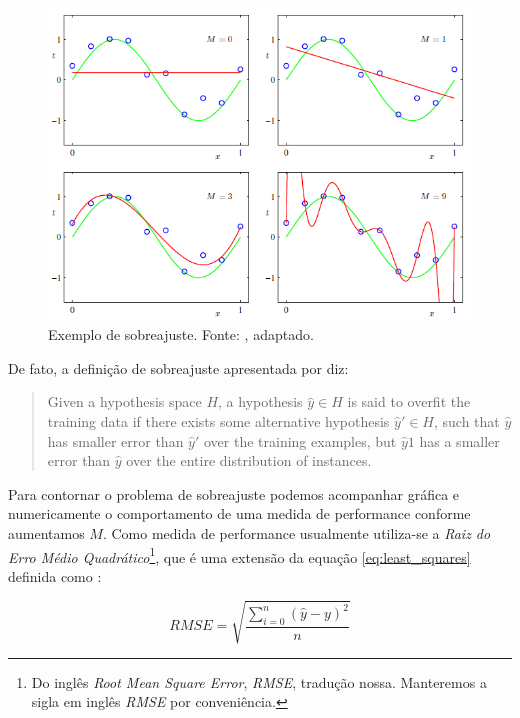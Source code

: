 \begin{figure}[h!]
\centering
\includegraphics[width=1\linewidth]{img/bishop_overfitting}
\caption[Exemplo de sobreajuste.]{Exemplo de sobreajuste. Fonte: \cite[p.7]{Bishop}, adaptado.}
\label{fig:bishop_overfitting}
\end{figure}

De fato, a definição de sobreajuste apresentada por \cite[p.67, adaptado]{Mitchell} diz:

\begin{quotation}
Given a hypothesis space $ H $, a hypothesis $ \hat{y} \in H $ is said to overfit the training data if there exists some alternative hypothesis $ \hat{y}' \in H $, such that $ \hat{y} $ has smaller error than $ \hat{y}' $ over the training examples, but $ \hat{y}1 $ has a smaller error than $ \hat{y} $ over the entire distribution of instances.
\end{quotation}

Para contornar o problema de sobreajuste podemos acompanhar gráfica e numericamente o comportamento de uma medida de performance conforme aumentamos $ M $. Como medida de performance usualmente utiliza-se  a \textit{Raiz do Erro Médio Quadrático}\footnote{Do inglês \textit{Root Mean Square Error}, \textit{RMSE}, tradução nossa. Manteremos a sigla em inglês \textit{RMSE} por conveniência.}, que é uma extensão da equação \ref{eq:least_squares} definida como \cite[p.7, adaptado]{Bishop}:

\begin{equation}
RMSE = \sqrt{\dfrac{\sum_{i=0}^{n} (\hat{y}-y)^2}{n}}
\end{equation} 

